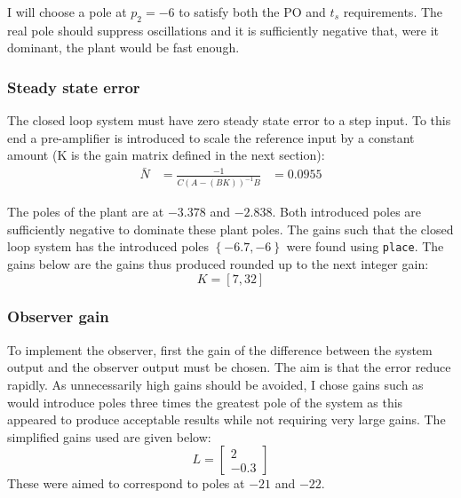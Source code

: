 I will choose a pole at $p_2=-6$ to satisfy both the PO and $t_s$ requirements. The real pole should suppress oscillations and it is sufficiently negative that, were it dominant, the plant would be fast enough.


\subsubsection*{Steady state error}
The closed loop system must have zero steady state error to a step input. To this end a pre-amplifier is introduced to scale the reference input by a constant amount (K is the gain matrix defined in the next section):
\begin{align*}
	\bar{N} &= \frac{-1}{C(A-(B K))^{-1}B}
	&= 0.0955
\end{align*}

The poles of the plant are at $-3.378$ and $-2.838$. Both introduced poles are sufficiently negative to dominate these plant poles.
The gains such that the closed loop system has the introduced poles $\left\{-6.7,-6\right\}$ were found using \texttt{place}. The gains below are the  gains thus produced rounded up to the next integer gain:
$$
K = \left[7, 32\right]
$$

\subsubsection*{Observer gain}
To implement the observer, first the gain of the difference between the system output and the observer output must be chosen. The aim is that the error reduce rapidly. As unnecessarily high gains should be avoided, I chose gains such as would introduce poles three times the greatest pole of the system as this appeared to produce acceptable results while not requiring very large gains. The simplified gains used are given below:
$$
L = \begin{bmatrix}
	2\\-0.3
\end{bmatrix}
$$
These were aimed to correspond to poles at $-21$ and $-22$.

